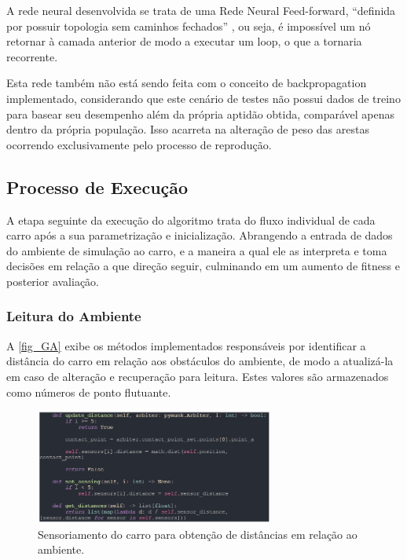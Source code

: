 A rede neural desenvolvida se trata de uma Rede Neural Feed-forward, “definida por possuir topologia sem caminhos fechados” \cite{montana1989davis}, ou seja, é impossível um nó retornar à camada anterior de modo a executar um loop, o que a tornaria recorrente. 

Esta rede também não está sendo feita com o conceito de backpropagation implementado, considerando que este cenário de testes não possui dados de treino para basear seu desempenho além da própria aptidão obtida, comparável apenas dentro da própria população. Isso acarreta na alteração de peso das arestas ocorrendo exclusivamente pelo processo de reprodução.

\subsection{Processo de Execução}
A etapa seguinte da execução do algoritmo trata do fluxo individual de cada carro após a sua parametrização e inicialização. Abrangendo a entrada de dados do ambiente de simulação ao carro, e a maneira a qual ele as interpreta e toma decisões em relação a que direção seguir, culminando em um aumento de fitness e posterior avaliação.

\subsubsection{Leitura do Ambiente}
A \autoref{fig_GA} exibe os métodos implementados responsáveis por identificar a distância do carro em relação aos obstáculos do ambiente, de modo a atualizá-la em caso de alteração e recuperação para leitura. Estes valores são armazenados como números de ponto flutuante.

\begin{figure}[htb]
        \centering
        \caption{\label{fig_GA}Sensoriamento do carro para obtenção de distâncias em relação ao ambiente.}
        \includegraphics[width=0.7\textwidth]{images/GA.png}
\end{figure}

